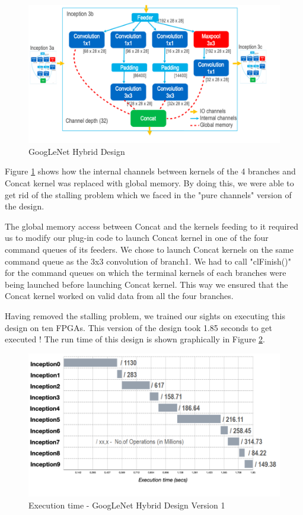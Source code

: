 \begin{figure}[!htb]
  \includegraphics[width=\textwidth,height=\textheight,keepaspectratio]{img/GoogLeNet_Hybrid.PNG}
  \caption{GoogLeNet Hybrid Design}
  \label{fig:GoogLeNet_Hybrid}
\end{figure}

 Figure \ref{fig:GoogLeNet_Hybrid} shows how the internal channels between kernels of the 4 branches and Concat kernel was replaced with global memory. By doing this, we were able to get rid of the stalling problem which we faced in the "pure channels" version of the design.
 
 The global memory access between Concat and the kernels feeding to it required us to modify our plug-in code to launch Concat kernel in one of the four command queues of its feeders. We chose to launch Concat kernels on the same command queue as the 3x3 convolution of branch1. We had to call "clFinish()" for the command queues on which the terminal kernels of each branches were being launched before launching Concat kernel. This way we ensured that the Concat kernel worked on valid data from all the four branches.
 
 Having removed the stalling problem, we trained our sights on executing this design on ten FPGAs. This version of the design took 1.85 seconds to get executed ! The run time of this design is shown graphically in Figure \ref{fig:GoogLeNetHybrid_Runtime_Graph}.
 
 \begin{figure}[!htb]
  \includegraphics[width=\textwidth,height=\textheight,keepaspectratio]{img/GoogLeNetHybrid_Runtime_Graph.png}
  \caption{Execution time - GoogLeNet Hybrid Design Version 1}
  \label{fig:GoogLeNetHybrid_Runtime_Graph}
\end{figure}

